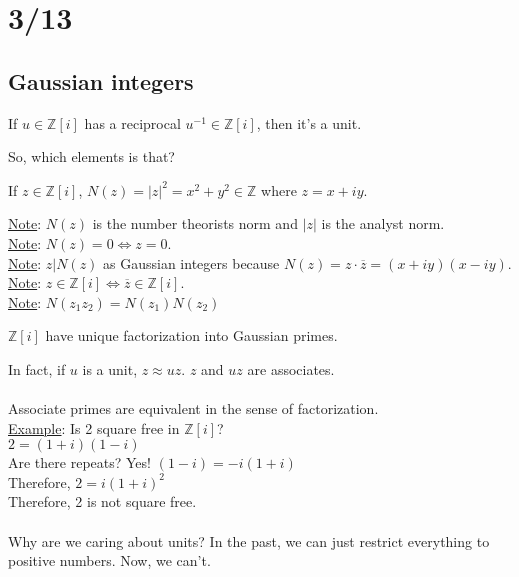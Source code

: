 \section*{3/13}
  \subsection*{Gaussian integers}
    \begin{definition}
      If $u \in \mathbb{Z}[i]$ has a reciprocal $u^{-1} \in \mathbb{Z}[i]$, 
      then it's a unit.
    \end{definition}
    So, which elements is that?
    \begin{definition}
      If $z \in \mathbb{Z}[i]$, $N(z) = |z|^2 = x^2 + y^2 \in \mathbb{Z}$
      where $z = x + iy$.
    \end{definition}
    \underline{Note}: $N(z)$ is the number theorists norm and $|z|$ is
      the analyst norm.\\
    \underline{Note}: $N(z) = 0 \Leftrightarrow z = 0$.\\
    \underline{Note}: $z | N(z)$ as Gaussian integers because $N(z) = z \cdot
      \overline{z} = (x + iy)(x - iy)$.\\
    \underline{Note}: $z \in \mathbb{Z}[i] \Leftrightarrow \overline{z} \in
      \mathbb{Z}[i]$.\\
    \underline{Note}: $N(z_1z_2) = N(z_1)N(z_2)$
    \begin{theorem}
      $\mathbb{Z}[i]$ have unique factorization into Gaussian primes.
    \end{theorem}
    In fact, if $u$ is a unit, $z \approx uz$. $z$ and $uz$ are associates.\\\\
    Associate primes are equivalent in the sense of factorization.\\
    \underline{Example}: Is 2 square free in $\mathbb{Z}[i]$?\\
      $2 = (1 + i)(1 - i)$\\
      Are there repeats? Yes! $(1 - i) = -i(1 + i)$\\
      Therefore, $2 = i(1 + i)^2$\\
      Therefore, 2 is not square free.\\\\
    Why are we caring about units? In the past, we can just restrict everything
    to positive numbers. Now, we can't.\\
